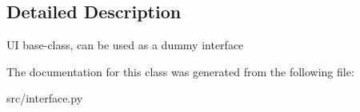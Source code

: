 \subsection{\-Detailed \-Description}
\begin{DoxyVerb}UI base-class, can be used as a dummy interface \end{DoxyVerb}
 

\-The documentation for this class was generated from the following file\-:\begin{DoxyCompactItemize}
\item 
src/interface.\-py\end{DoxyCompactItemize}
